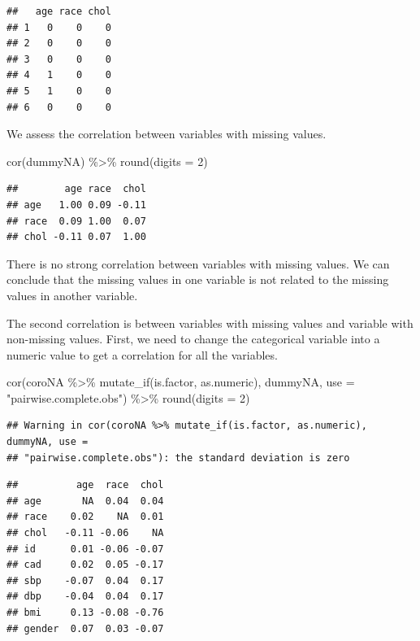 \documentclass[
  10pt,
]{krantz}
\newenvironment{Shaded}{\begin{snugshade}}{\end{snugshade}}
\newcommand{\AttributeTok}[1]{\textcolor[rgb]{0.77,0.63,0.00}{#1}}
\newcommand{\DecValTok}[1]{\textcolor[rgb]{0.00,0.00,0.81}{#1}}
\newcommand{\FunctionTok}[1]{\textcolor[rgb]{0.00,0.00,0.00}{#1}}
\newcommand{\NormalTok}[1]{#1}
\newcommand{\SpecialCharTok}[1]{\textcolor[rgb]{0.00,0.00,0.00}{#1}}
\newcommand{\StringTok}[1]{\textcolor[rgb]{0.31,0.60,0.02}{#1}}
\begin{document}
\begin{verbatim}
##   age race chol
## 1   0    0    0
## 2   0    0    0
## 3   0    0    0
## 4   1    0    0
## 5   1    0    0
## 6   0    0    0
\end{verbatim}

We assess the correlation between variables with missing values.

\begin{Shaded}
\begin{Highlighting}[]
\FunctionTok{cor}\NormalTok{(dummyNA) }\SpecialCharTok{\%\textgreater{}\%} \FunctionTok{round}\NormalTok{(}\AttributeTok{digits =} \DecValTok{2}\NormalTok{)}
\end{Highlighting}
\end{Shaded}

\begin{verbatim}
##        age race  chol
## age   1.00 0.09 -0.11
## race  0.09 1.00  0.07
## chol -0.11 0.07  1.00
\end{verbatim}

There is no strong correlation between variables with missing values. We can conclude that the missing values in one variable is not related to the missing values in another variable.

The second correlation is between variables with missing values and variable with non-missing values. First, we need to change the categorical variable into a numeric value to get a correlation for all the variables.

\begin{Shaded}
\begin{Highlighting}[]
\FunctionTok{cor}\NormalTok{(coroNA }\SpecialCharTok{\%\textgreater{}\%} \FunctionTok{mutate\_if}\NormalTok{(is.factor, as.numeric), }
\NormalTok{    dummyNA, }\AttributeTok{use =} \StringTok{"pairwise.complete.obs"}\NormalTok{) }\SpecialCharTok{\%\textgreater{}\%} 
  \FunctionTok{round}\NormalTok{(}\AttributeTok{digits =} \DecValTok{2}\NormalTok{)}
\end{Highlighting}
\end{Shaded}

\begin{verbatim}
## Warning in cor(coroNA %>% mutate_if(is.factor, as.numeric), dummyNA, use =
## "pairwise.complete.obs"): the standard deviation is zero
\end{verbatim}

\begin{verbatim}
##          age  race  chol
## age       NA  0.04  0.04
## race    0.02    NA  0.01
## chol   -0.11 -0.06    NA
## id      0.01 -0.06 -0.07
## cad     0.02  0.05 -0.17
## sbp    -0.07  0.04  0.17
## dbp    -0.04  0.04  0.17
## bmi     0.13 -0.08 -0.76
## gender  0.07  0.03 -0.07
\end{verbatim}
\end{document}
